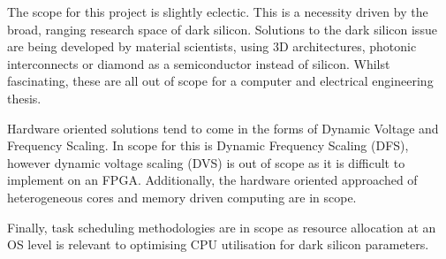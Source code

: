 	The scope for this project is slightly eclectic. This is a necessity driven by the broad, ranging research space of dark silicon. Solutions to the dark silicon issue are being developed by material scientists, using 3D architectures, photonic interconnects or diamond as a semiconductor instead of silicon. Whilst fascinating, these are all out of scope for a computer and electrical engineering thesis.
	
	Hardware oriented solutions tend to come in the forms of Dynamic Voltage and Frequency Scaling. In scope for this is Dynamic Frequency Scaling (DFS), however dynamic voltage scaling (DVS) is out of scope as it is difficult to implement on an FPGA. Additionally, the hardware oriented approached of heterogeneous cores and memory driven computing are in scope.
	
	Finally, task scheduling methodologies are in scope as resource allocation at an OS level is relevant to optimising CPU utilisation for dark silicon parameters.

